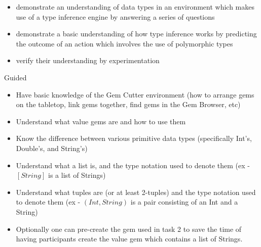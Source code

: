 
	{
		\begin{itemize}
			\item demonstrate an understanding of data types in an environment which makes use of a type inference engine by answering a series of questions
			\item demonstrate a basic understanding of how type inference works by predicting the outcome of an action which involves the use of polymorphic types
			\item verify their understanding by experimentation
		\end{itemize}
	}
	{Guided}
	{
		\begin{itemize}
			\item Have basic knowledge of the Gem Cutter environment (how to arrange gems on the tabletop, link gems together, find gems in the Gem Browser, etc)
			\item Understand what value gems are and how to use them
			\item Know the difference between various primitive data types (specifically Int's, Double's, and String's)
			\item Understand what a list is, and the type notation used to denote them (ex - \([String]\) is a list of Strings)
			\item Understand what tuples are (or at least 2-tuples) and the type notation used to denote them (ex - \((Int, String)\) is a pair consisting of an Int and a String)
		\end{itemize}
	}
	{
		\begin{itemize}
			\item Optionally one can pre-create the gem used in task 2 to save the time of having participants create the value gem which contains a list of Strings.
		\end{itemize}
	}

